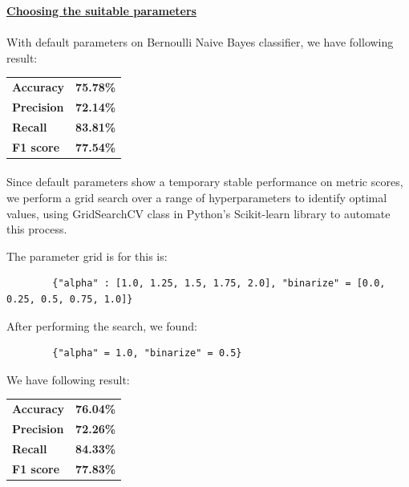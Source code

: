 \documentclass[a4paper]{report}
\begin{document}
	\underline{\textbf{\Large Choosing the suitable parameters}}
	\paragraph{}
	With default parameters on Bernoulli Naive Bayes classifier, we have following result:
	
	\begin{center}
		\begin{tabular}{ll}
			\toprule
			\textbf{Accuracy} & \textbf{75.78\%} \\
			\textbf{Precision}  & \textbf{72.14\%} \\
			\textbf{Recall}     & \textbf{83.81\%} \\
			\textbf{F1 score}   & \textbf{77.54\%} \\
			\bottomrule
		\end{tabular}
	\end{center}
	
	\paragraph{}
	Since default parameters show a temporary stable performance on metric scores, we perform a grid search over a range of hyperparameters to identify optimal values, using GridSearchCV class in Python's Scikit-learn library to automate this process. 
	
	The parameter grid is for this is: 
	\begin{verbatim}
		{"alpha" : [1.0, 1.25, 1.5, 1.75, 2.0], "binarize" = [0.0, 0.25, 0.5, 0.75, 1.0]}
	\end{verbatim}
	
	After performing the search, we found:
	\begin{verbatim}
		{"alpha" = 1.0, "binarize" = 0.5}
	\end{verbatim}
	
	We have following result:
	
	\begin{center}
		\begin{tabular}{ll}
			\toprule
			\textbf{Accuracy} & \textbf{76.04\%} \\
			\textbf{Precision}  & \textbf{72.26\%} \\
			\textbf{Recall}     & \textbf{84.33\%} \\
			\textbf{F1 score}   & \textbf{77.83\%} \\
			\bottomrule
		\end{tabular}
	\end{center}
	
\end{document}
